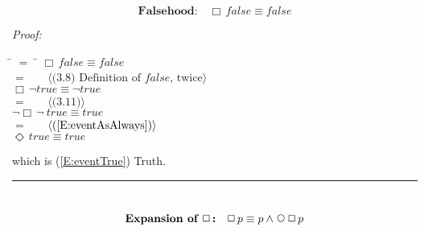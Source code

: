 \documentclass[fleqn, leqno]{article}
\newcommand{\lgap}{2pt}                             %
\newcommand{\mymathindent}{24pt}                    %
\newcommand{\Next}{\;\,\text{\raisebox{3.5pt}{\circle{6}}}}
\newcommand{\Event}{\Diamond\,}
\newcommand{\Always}{\Box\,}
\newcommand{\myqed}{\hfill\rule[-.23ex]{1.2ex}{2.0ex}}
\newcommand{\Gll} {\langle}                         %
\newcommand{\Ggg} {\rangle}                         %
\newcommand{\Hint}[1]     {\ \ \ $\Gll              \mbox{#1} \Ggg$ }   %
\begin{document}
\begin{equation}\label{E:alwaysFalse}
\textbf{Falsehood:}\quad \Always false \equiv false
\end{equation}

\emph{Proof:}
\begin{tabbing}
\hspace{\mymathindent} \= $= \;$ \= \kill
  \> \>   $\Always false \equiv false$\\[\lgap]
  \> $=$  \>  \Hint{(3.8) Definition of $false$, twice}\\[\lgap]
  \> \>   $\Always\lnot true \equiv \lnot true$\\[\lgap]
  \> $=$  \>  \Hint{(3.11)}\\[\lgap]
  \> \>   $\lnot\Always\lnot\ true \equiv true$\\[\lgap]
  \> $=$  \>  \Hint{(\ref{E:eventAsAlways})}\\[\lgap]
  \> \>   $\Event true \equiv true$\\[\lgap]
\end{tabbing}
which is (\ref{E:eventTrue}) Truth. \myqed\\[\lgap]


\begin{equation}\label{E:expansionAlways}
\textbf{Expansion of $\Always$:}\quad \Always p \equiv p \land \Next\Always p
\end{equation}
\end{document}
